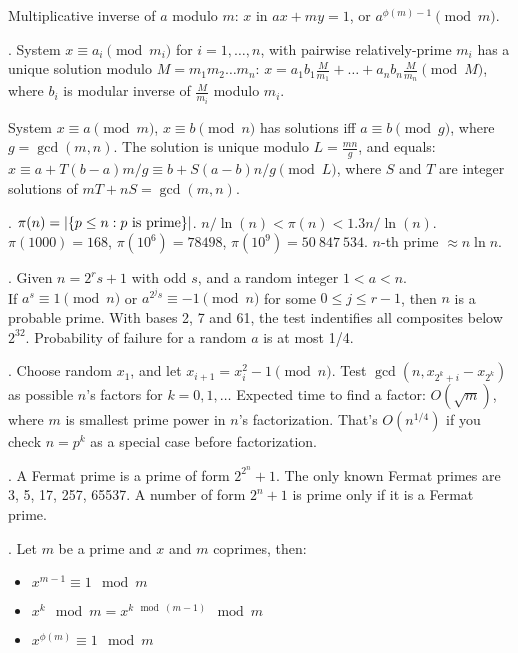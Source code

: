 Multiplicative inverse of $a$ modulo $m$:
$x$ in $ax + my = 1$, or $a^{\phi(m)-1} \pmod{m}$.

.
System $x \equiv a_i \pmod{m_i}$ for $i=1,\dots,n$, with
pairwise relatively-prime $m_i$ has a unique solution modulo $M = m_1 m_2 \dots m_n$:
$x = a_1 b_1 \frac{M}{m_1} + \dots + a_n b_n \frac{M}{m_n} \pmod{M}$,
where $b_i$ is modular inverse of $\frac{M}{m_i}$ modulo $m_i$.

System $x \equiv a \pmod{m}$, $x \equiv b \pmod{n}$ has solutions
iff $a \equiv b \pmod{g}$, where $g=\gcd(m,n)$.
The solution is unique modulo $L=\frac{mn}{g}$, and equals:
$x \equiv a + T(b-a) m/g \equiv b + S(a-b) n/g \pmod{L}$,
where $S$ and $T$ are integer solutions of $mT + nS = \gcd(m,n)$.

. $\pi(n) = |\{p \le n : p \hbox{ is prime}\}|$.
$n/\ln(n) < \pi(n) < 1.3 n/\ln(n)$.
$\pi(1000) = 168$, $\pi(10^6) = 78498$, $\pi(10^9) = 50\ 847\ 534$.
\quad $n$-th prime $\approx n \ln n$.

.
Given $n = 2^r s + 1$ with odd $s$, and a random integer $1 < a < n$. \\
If $a^s \equiv 1 {\pmod n}$ or $a^{2^j s} \equiv -1 {\pmod n}$ for some
$0 \le j \le r-1$, then $n$ is a probable prime.
With bases 2, 7 and 61, the test indentifies all composites below $2^{32}$.
Probability of failure for a random $a$ is at most 1/4.

.
Choose random $x_1$, and let $x_{i+1} = x_i^2 - 1 \pmod{n}$.
Test $\gcd(n, x_{2^k+i} - x_{2^k})$ as possible $n$'s factors for $k=0,1,\ldots$
Expected time to find a factor: $O(\sqrt{m})$, where $m$ is smallest
prime power in $n$'s factorization.
That's $O(n^{1/4})$ if you check $n = p^k$ as a special case before factorization.

.  A Fermat prime is a prime of form $2^{2^n}+1$.
The only known Fermat primes are 3, 5, 17, 257, 65537.
A number of form $2^n+1$ is prime only if it is a Fermat prime.


. Let $m$ be a prime and $x$ and $m$ coprimes, then:
\begin{itemize}
\item $x^{m-1} \equiv 1 \mod m $
\item $x^{k} \mod m = x^{k \mod (m-1)} \mod m$
\item $x^{\phi(m)} \equiv 1 \mod m $
\end{itemize}

